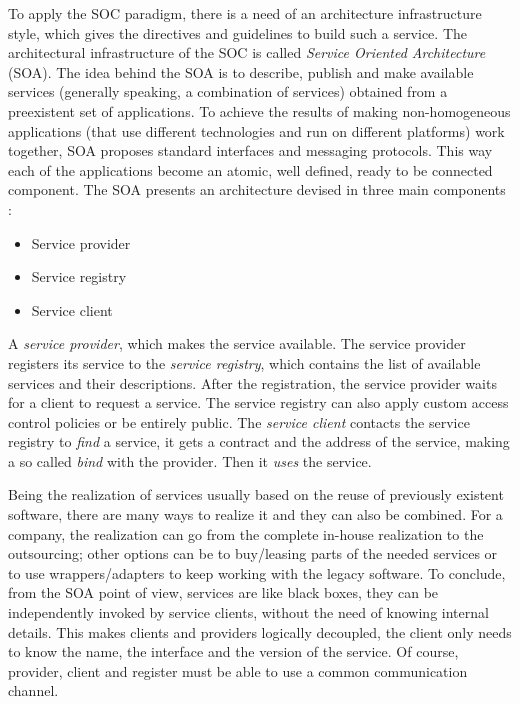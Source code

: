 To apply the SOC paradigm, there is a need of an architecture infrastructure style, which gives the directives and guidelines to build such a service.  
The architectural infrastructure of the SOC is called \textit{Service Oriented Architecture} (SOA). 
The idea behind the SOA is to describe, publish and make available services (generally speaking, a combination of services) obtained from a preexistent set of applications. 
To achieve the results of making non-homogeneous applications (that use different technologies and run on different platforms) work together, SOA proposes standard interfaces and messaging protocols. This way each of the applications become an atomic, well defined, ready to be connected component. 
The SOA presents an architecture devised in three main components \cite{Pernici04}:
\begin{itemize}
 \item Service provider
 \item Service registry
 \item Service client
\end{itemize}
A \textit{service provider}, which makes the service available. The service provider registers its service to the \textit{service registry}, which contains the list of available services and their descriptions. After the registration, the service provider waits for a client to request a service. The service registry can also apply custom access control policies or be entirely public. 
The \textit{service client} contacts the service registry to \textit{find} a service, it gets a contract and the address of the service, making a so called \textit{bind} with the provider. Then it \textit{uses} the service.


Being the realization of services usually based on the reuse of previously existent software, there are many ways to realize it and they can also be combined. For a company, the realization can go from the complete in-house realization to the outsourcing; other options can be to buy/leasing parts of the needed services or to use wrappers/adapters to keep working with the legacy software.
To conclude, from the SOA point of view, services are like black boxes, they can be independently invoked by service clients, without the need of knowing internal details. This makes clients and providers logically decoupled, the client only needs to know the name, the interface and the version of the service. Of course, provider, client and register must be able to use a common communication channel. 

